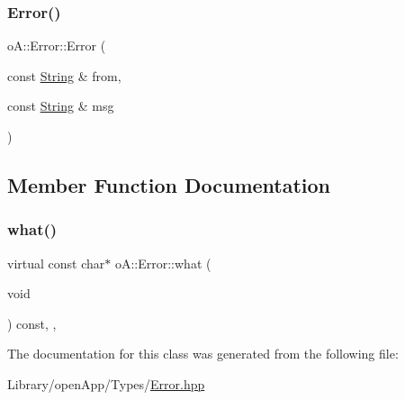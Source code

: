 \mbox{\label{classo_a_1_1_error_adf66492ca8b03fa14d09e5bba7cdacbd}} 
\subsubsection{\texorpdfstring{Error()}{Error()}\hspace{0.1cm}{\footnotesize\ttfamily [2/2]}}
{\footnotesize\ttfamily o\+A\+::\+Error\+::\+Error (\begin{DoxyParamCaption}\item[{const \mbox{\hyperlink{classo_a_1_1_string}{String}} \&}]{from,  }\item[{const \mbox{\hyperlink{classo_a_1_1_string}{String}} \&}]{msg }\end{DoxyParamCaption})\hspace{0.3cm}{\ttfamily [inline]}}



\subsection{Member Function Documentation}
\mbox{\label{classo_a_1_1_error_aaef80480c87b91b1a34853c791b649ef}} 
\subsubsection{\texorpdfstring{what()}{what()}}
{\footnotesize\ttfamily virtual const char$\ast$ o\+A\+::\+Error\+::what (\begin{DoxyParamCaption}\item[{void}]{ }\end{DoxyParamCaption}) const\hspace{0.3cm}{\ttfamily [inline]}, {\ttfamily [virtual]}, {\ttfamily [noexcept]}}



The documentation for this class was generated from the following file\+:\begin{DoxyCompactItemize}
\item 
Library/open\+App/\+Types/\mbox{\hyperlink{_error_8hpp}{Error.\+hpp}}\end{DoxyCompactItemize}
